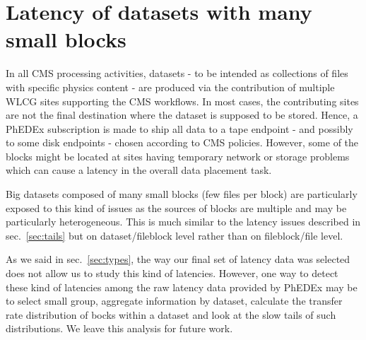 \section{Latency of datasets with many small blocks}

In all CMS processing activities, datasets - to be intended as
collections of files with specific physics content - are produced via
the contribution of multiple WLCG sites supporting the CMS
workflows. In most cases, the contributing sites are not the final
destination where the dataset is supposed to be stored. Hence, a
PhEDEx subscription is made to ship all data to a tape endpoint - and
possibly to some disk endpoints - chosen according to CMS
policies. However, some of the blocks might be located at sites having
temporary network or storage problems which can cause a latency in
the overall data placement task.

Big datasets composed of many small blocks (few files per block) are
particularly exposed to this kind of issues as the sources of blocks
are multiple and may be particularly heterogeneous. This is much
similar to the latency issues described in sec.~\ref{sec:tails} but on
dataset/fileblock level rather than on fileblock/file level.

As we said in sec.~\ref{sec:types}, the way our final set of latency
data was selected does not allow us to study this kind of
latencies. However, one way to detect these kind of latencies among
the raw latency data provided by PhEDEx may be to select small group,
aggregate information by dataset, calculate the transfer rate
distribution of bocks within a dataset and look at the slow tails of
such distributions. We leave this analysis for future work.

